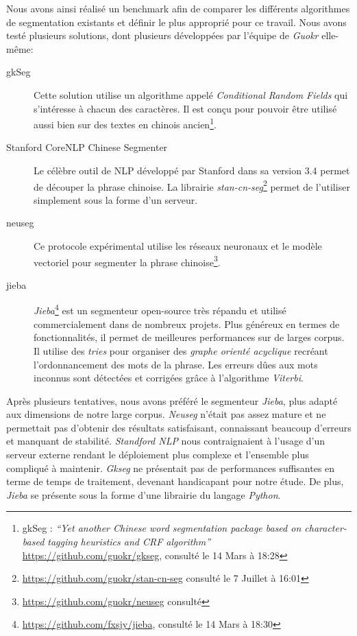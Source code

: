     Nous avons ainsi réalisé un benchmark afin de comparer les différents algorithmes de segmentation existants et définir le plus approprié pour ce travail. Nous avons testé plusieurs solutions, dont plusieurs développées par l'équipe de \textit{Guokr} elle-même:  

    \begin{description}
        \item[gkSeg] 
        Cette solution utilise un algorithme appelé \textit{Conditional Random Fields} qui s'intéresse à chacun des caractères. Il est conçu pour pouvoir être utilisé aussi bien sur des  textes en chinois ancien\footnote{ gkSeg : \textit{{\textquotedblleft}Yet another Chinese word segmentation package based on character-based tagging heuristics and CRF algorithm{\textquotedblright} }\url{https://github.com/guokr/gkseg}, consulté le 14 Mars à 18:28}.

        \item[Stanford CoreNLP Chinese Segmenter]
        Le célèbre outil de NLP développé par Stanford dans sa version 3.4 permet de découper la phrase chinoise. La librairie \textit{stan-cn-seg}\footnote{\url{https://github.com/guokr/stan-cn-seg} consulté le 7 Juillet à 16:01} permet de l'utiliser simplement sous la forme d'un serveur.

        \item[neuseg]
        Ce protocole expérimental utilise les réseaux neuronaux et le modèle vectoriel pour segmenter la phrase chinoise\footnote{\url{https://github.com/guokr/neuseg} consulté }.

        \item[jieba]
        \textit{Jieba}\footnote{ \url{https://github.com/fxsjy/jieba}, consulté le 14 Mars à 18:30} est un segmenteur open-source très répandu et utilisé commercialement dans de nombreux projets. Plus généreux en termes de fonctionnalités, il permet de meilleures performances sur de larges corpus. Il utilise des \textit{tries} pour organiser des \textit{graphe orienté acyclique} recréant l'ordonnancement des mots de la phrase. Les erreurs dûes aux mots inconnus sont détectées et corrigées grâce à l'algorithme \textit{Viterbi}.
    \end{description}

     Après plusieurs tentatives, nous avons préféré le segmenteur \textit{Jieba}, plus adapté aux dimensions de notre large corpus. \textit{Neuseg} n'était pas assez mature et ne permettait pas d'obtenir des résultats satisfaisant, connaissant beaucoup d'erreurs et manquant de stabilité. \textit{Standford NLP} nous contraignaient à l'usage d'un serveur externe rendant le déploiement plus complexe et l'ensemble plus compliqué à maintenir. \textit{Gkseg} ne présentait pas de performances suffisantes en terme de temps de traitement, devenant handicapant pour notre étude. De plus, \textit{Jieba} se présente sous la forme d'une librairie du langage \textit{Python}.

